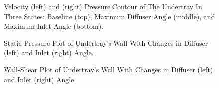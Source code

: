 \begin{center}
  \begin{figure}[!ht]
    \noindent{}
    \caption{Velocity (left) and (right) Pressure Contour of The Undertray In Three States: Baseline (top), Maximum Diffuser Angle (middle), and Maximum Inlet Angle (bottom).}
    \label{fig:compile_2D_EN_pressure_velocity}
\end{figure}


\begin{figure}
    \noindent{}
    \caption{Static Pressure Plot of Undertray's Wall With Changes in Diffuser (left) and Inlet (right) Angle.}
    \label{fig:pressure_plot_2D_EN}
\end{figure}

\begin{figure}
    \noindent{}
    \caption{Wall-Shear Plot of Undertray's Wall With Changes in Diffuser (left) and Inlet (right) Angle.}
    \label{fig:wall_shear_plot_2D_EN}
\end{figure}  
\end{center}


